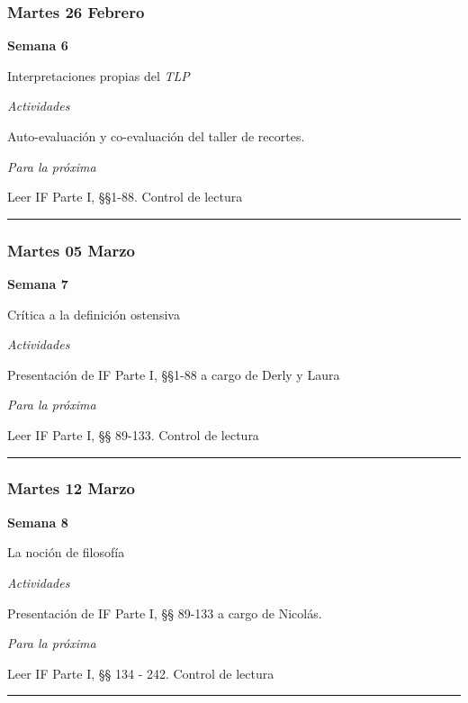\documentclass[spanish,]{article}
\begin{document}
\subsubsection{Martes 26 Febrero}\label{martes-26-febrero}

\textbf{Semana 6}

Interpretaciones propias del \emph{TLP}

\emph{Actividades}

Auto-evaluación y co-evaluación del taller de recortes.

\emph{Para la próxima}

Leer IF Parte I, §§1-88. Control de lectura

\begin{center}\rule{0.5\linewidth}{\linethickness}\end{center}

\subsubsection{Martes 05 Marzo}\label{martes-05-marzo}

\textbf{Semana 7}

Crítica a la definición ostensiva

\emph{Actividades}

Presentación de IF Parte I, §§1-88 a cargo de Derly y Laura

\emph{Para la próxima}

Leer IF Parte I, §§ 89-133. Control de lectura

\begin{center}\rule{0.5\linewidth}{\linethickness}\end{center}

\subsubsection{Martes 12 Marzo}\label{martes-12-marzo}

\textbf{Semana 8}

La noción de filosofía

\emph{Actividades}

Presentación de IF Parte I, §§ 89-133 a cargo de Nicolás.

\emph{Para la próxima}

Leer IF Parte I, §§ 134 - 242. Control de lectura

\begin{center}\rule{0.5\linewidth}{\linethickness}\end{center}
\end{document}
